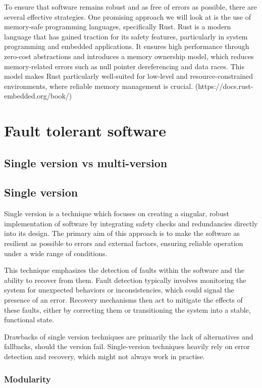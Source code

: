 \documentclass[12pt, letterpaper]{article}
\begin{document}
To ensure that software remains robust and as free of errors as possible, there are several effective strategies. One promising approach we will look at is the use of memory-safe programming languages, specifically Rust. Rust is a modern language that has gained traction for its safety features, particularly in system programming and embedded applications. It ensures high performance through zero-cost abstractions and introduces a memory ownership model, which reduces memory-related errors such as null pointer dereferencing and data races. This model makes Rust particularly well-suited for low-level and resource-constrained environments, where reliable memory management is crucial. (https://docs.rust-embedded.org/book/)

\section{Fault tolerant software}

\subsection{Single version vs multi-version}

\subsection{Single version}

Single version is a technique which focuses on creating a singular, robust implementation of software by integrating safety checks and redundancies directly into its design. The primary aim of this approach is to make the software as resilient as possible to errors and external factors, ensuring reliable operation under a wide range of conditions.

This technique emphasizes the detection of faults within the software and the ability to recover from them. Fault detection typically involves monitoring the system for unexpected behaviors or inconsistencies, which could signal the presence of an error. Recovery mechanisms then act to mitigate the effects of these faults, either by correcting them or transitioning the system into a stable, functional state.

Drawbacks of single version techniques are primarily the lack of alternatives and fallbacks, should the version fail. Single-version techniques heavily rely on error detection and recovery, which might not always work in practise.

\subsubsection{Modularity}
\end{document}
